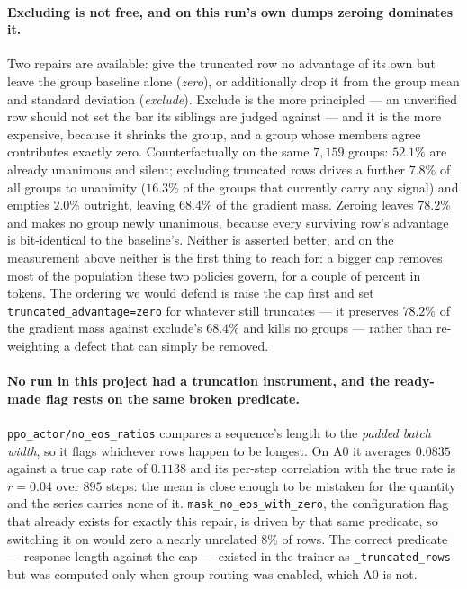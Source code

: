 \paragraph{Excluding is not free, and on this run's own dumps zeroing dominates it.} Two
repairs are available: give the truncated row no advantage of its own but leave the group
baseline alone (\emph{zero}), or additionally drop it from the group mean and standard
deviation (\emph{exclude}). Exclude is the more principled --- an unverified row should not
set the bar its siblings are judged against --- and it is the more expensive, because it
shrinks the group, and a group whose members agree contributes exactly zero. Counterfactually
on the same $7{,}159$ groups: $52.1\%$ are already unanimous and silent; excluding truncated
rows drives a further $\mathbf{7.8\%}$ of all groups to unanimity ($16.3\%$ of the groups that
currently carry any signal) and empties $2.0\%$ outright, leaving $68.4\%$ of the gradient
mass. Zeroing leaves $78.2\%$ and makes no group newly unanimous, because every surviving
row's advantage is bit-identical to the baseline's. Neither is asserted better, and on the
measurement above neither is the first thing to reach for: a bigger cap removes most of the
population these two policies govern, for a couple of percent in tokens. The ordering we would defend is raise the cap
first and set \texttt{truncated\_advantage=zero} for whatever still truncates --- it
preserves $78.2\%$ of the gradient mass against exclude's $68.4\%$ and kills no groups ---
rather than re-weighting a defect that can simply be removed.

\paragraph{No run in this project had a truncation instrument, and the ready-made flag rests
on the same broken predicate.} \texttt{ppo\_actor/no\_eos\_ratios} compares a sequence's
length to the \emph{padded batch width}, so it flags whichever rows happen to be longest. On
A0 it averages $0.0835$ against a true cap rate of $0.1138$ and its per-step correlation with
the true rate is $r=0.04$ over $895$ steps: the mean is close enough to be mistaken for the
quantity and the series carries none of it. \texttt{mask\_no\_eos\_with\_zero}, the
configuration flag that already exists for exactly this repair, is driven by that same
predicate, so switching it on would zero a nearly unrelated $8\%$ of rows. The correct
predicate --- response length against the cap --- existed in the trainer as
\texttt{\_truncated\_rows} but was computed only when group routing was enabled, which A0 is
not.

